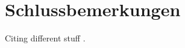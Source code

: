 \chapter{Schlussbemerkungen}
\label{cha:Schluss}

Citing different stuff \cite{BachBWV988,Bacher2004,Bezos2023,BurgeBurger1999,Burger1987}.
